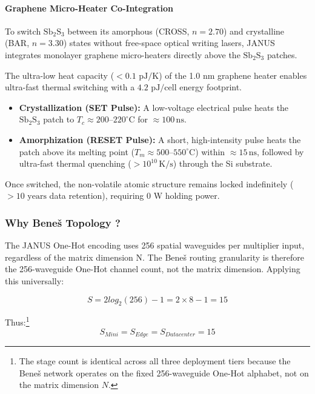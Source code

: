 \documentclass[journal]{IEEEtran}
\begin{document}
\paragraph{\textbf{Graphene Micro-Heater Co-Integration}}
To switch $\mathrm{Sb_2S_3}$ between its amorphous (CROSS, $n=2.70$) and crystalline (BAR, $n=3.30$) states without free-space optical writing lasers, JANUS integrates monolayer graphene micro-heaters directly above the $\mathrm{Sb_2S_3}$ patches.

The ultra-low heat capacity ($< 0.1\text{ pJ/K}$) of the 1.0 nm graphene heater enables ultra-fast thermal switching with a $4.2\text{ pJ/cell}$ energy footprint. 

\begin{itemize}
\item \textbf{Crystallization (SET Pulse):} A low-voltage electrical pulse heats the $\mathrm{Sb_2S_3}$ patch to $T_c \approx 200\text{--}220^\circ\mathrm{C}$ for $\approx 100\,\mathrm{ns}$.
\item \textbf{Amorphization (RESET Pulse):} A short, high-intensity pulse heats the patch above its melting point ($T_m \approx 500\text{--}550^\circ\mathrm{C}$) within $\approx 15\,\mathrm{ns}$, followed by ultra-fast thermal quenching ($> 10^{10}\,\mathrm{K/s}$) through the Si substrate.
\end{itemize}

Once switched, the non-volatile atomic structure remains locked indefinitely ($> 10\text{ years}$ data retention), requiring 0 W holding power.
\subsubsection{\textbf{Why Beneš Topology ?}}


The JANUS One-Hot encoding uses 256 spatial waveguides per multiplier input, regardless of the matrix dimension N. The Beneš routing granularity is therefore the 256-waveguide One-Hot channel count, not the matrix dimension. Applying this universally:

\begin{equation}
S = 2 log_2(256) - 1 = 2 \times 8 - 1 = 15
\end{equation}

Thus:\footnote{The stage count is identical across all three deployment tiers because the Bene\v{s} network operates on the fixed 256-waveguide One-Hot alphabet, not on the matrix dimension $N$.}
\begin{equation}
S_{Mini} = S_{Edge} = S_{Datacenter} = 15
\end{equation}
\end{document}
